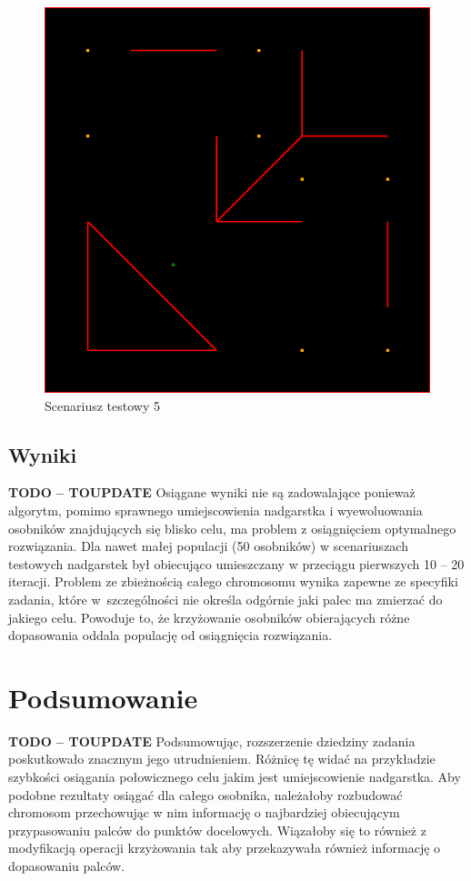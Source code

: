 \documentclass[11pt, leqno]{article}
\begin{document}
\begin{figure}[h!]
	\centering
	\includegraphics[scale=0.4]{scenario5}
	\caption{Scenariusz testowy 5}
	\label{fig:sc5}
\end{figure}

\subsection{Wyniki}
\textbf{TODO -- TOUPDATE}
Osiągane wyniki nie są zadowalające ponieważ algorytm, pomimo sprawnego umiejscowienia nadgarstka i wyewoluowania osobników znajdujących się blisko celu, ma problem z osiągnięciem optymalnego rozwiązania. Dla nawet małej populacji (50 osobników) w scenariuszach testowych nadgarstek był obiecująco umieszczany w przeciągu pierwszych 10 -- 20 iteracji. Problem ze zbieżnością całego chromosomu wynika zapewne ze specyfiki zadania, które w~szczególności nie określa odgórnie jaki palec ma zmierzać do jakiego celu. Powoduje to, że krzyżowanie osobników obierających różne dopasowania oddala populację od osiągnięcia rozwiązania.

\section{Podsumowanie}
\textbf{TODO -- TOUPDATE}
Podsumowując, rozszerzenie dziedziny zadania poskutkowało znacznym jego utrudnieniem. Różnicę tę widać na przykładzie szybkości osiągania połowicznego celu jakim jest umiejscowienie nadgarstka. Aby podobne rezultaty osiągać dla całego osobnika, należałoby rozbudować chromosom przechowując w nim informację o najbardziej obiecującym przypasowaniu palców do punktów docelowych. Wiązałoby się to również z modyfikacją operacji krzyżowania tak aby przekazywała również informację o dopasowaniu palców.
\end{document}
